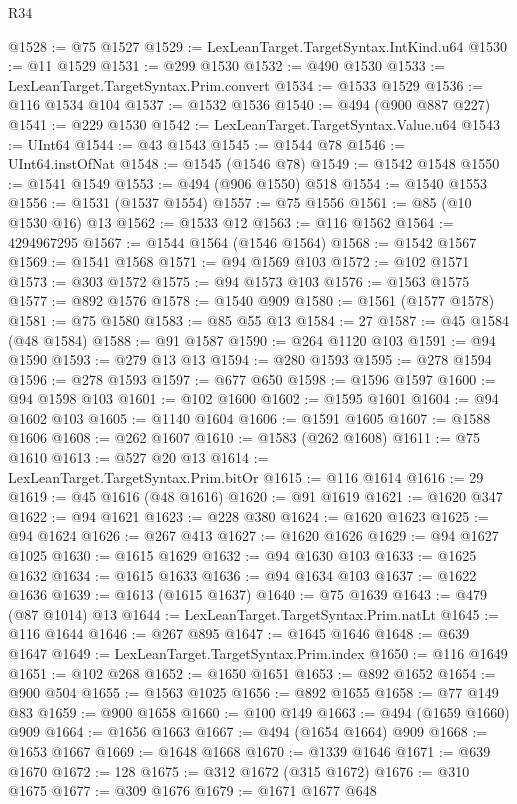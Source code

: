 \begin{lexlean}{R34}
\begin{coremodule}
@1528 := @75 @1527
@1529 := LexLeanTarget.TargetSyntax.IntKind.u64
@1530 := @11 @1529
@1531 := @299 @1530
@1532 := @490 @1530
@1533 := LexLeanTarget.TargetSyntax.Prim.convert
@1534 := @1533 @1529
@1536 := @116 @1534 @104
@1537 := @1532 @1536
@1540 := @494 (@900 @887 @227)
@1541 := @229 @1530
@1542 := LexLeanTarget.TargetSyntax.Value.u64
@1543 := UInt64
@1544 := @43 @1543
@1545 := @1544 @78
@1546 := UInt64.instOfNat
@1548 := @1545 (@1546 @78)
@1549 := @1542 @1548
@1550 := @1541 @1549
@1553 := @494 (@906 @1550) @518
@1554 := @1540 @1553
@1556 := @1531 (@1537 @1554)
@1557 := @75 @1556
@1561 := @85 (@10 @1530 @16) @13
@1562 := @1533 @12
@1563 := @116 @1562
@1564 := 4294967295
@1567 := @1544 @1564 (@1546 @1564)
@1568 := @1542 @1567
@1569 := @1541 @1568
@1571 := @94 @1569 @103
@1572 := @102 @1571
@1573 := @303 @1572
@1575 := @94 @1573 @103
@1576 := @1563 @1575
@1577 := @892 @1576
@1578 := @1540 @909
@1580 := @1561 (@1577 @1578)
@1581 := @75 @1580
@1583 := @85 @55 @13
@1584 := 27
@1587 := @45 @1584 (@48 @1584)
@1588 := @91 @1587
@1590 := @264 @1120 @103
@1591 := @94 @1590
@1593 := @279 @13 @13
@1594 := @280 @1593
@1595 := @278 @1594
@1596 := @278 @1593
@1597 := @677 @650
@1598 := @1596 @1597
@1600 := @94 @1598 @103
@1601 := @102 @1600
@1602 := @1595 @1601
@1604 := @94 @1602 @103
@1605 := @1140 @1604
@1606 := @1591 @1605
@1607 := @1588 @1606
@1608 := @262 @1607
@1610 := @1583 (@262 @1608)
@1611 := @75 @1610
@1613 := @527 @20 @13
@1614 := LexLeanTarget.TargetSyntax.Prim.bitOr
@1615 := @116 @1614
@1616 := 29
@1619 := @45 @1616 (@48 @1616)
@1620 := @91 @1619
@1621 := @1620 @347
@1622 := @94 @1621
@1623 := @228 @380
@1624 := @1620 @1623
@1625 := @94 @1624
@1626 := @267 @413
@1627 := @1620 @1626
@1629 := @94 @1627 @1025
@1630 := @1615 @1629
@1632 := @94 @1630 @103
@1633 := @1625 @1632
@1634 := @1615 @1633
@1636 := @94 @1634 @103
@1637 := @1622 @1636
@1639 := @1613 (@1615 @1637)
@1640 := @75 @1639
@1643 := @479 (@87 @1014) @13
@1644 := LexLeanTarget.TargetSyntax.Prim.natLt
@1645 := @116 @1644
@1646 := @267 @895
@1647 := @1645 @1646
@1648 := @639 @1647
@1649 := LexLeanTarget.TargetSyntax.Prim.index
@1650 := @116 @1649
@1651 := @102 @268
@1652 := @1650 @1651
@1653 := @892 @1652
@1654 := @900 @504
@1655 := @1563 @1025
@1656 := @892 @1655
@1658 := @77 @149 @83
@1659 := @900 @1658
@1660 := @100 @149
@1663 := @494 (@1659 @1660) @909
@1664 := @1656 @1663
@1667 := @494 (@1654 @1664) @909
@1668 := @1653 @1667
@1669 := @1648 @1668
@1670 := @1339 @1646
@1671 := @639 @1670
@1672 := 128
@1675 := @312 @1672 (@315 @1672)
@1676 := @310 @1675
@1677 := @309 @1676
@1679 := @1671 @1677 @648

\end{coremodule}
\end{lexlean}

